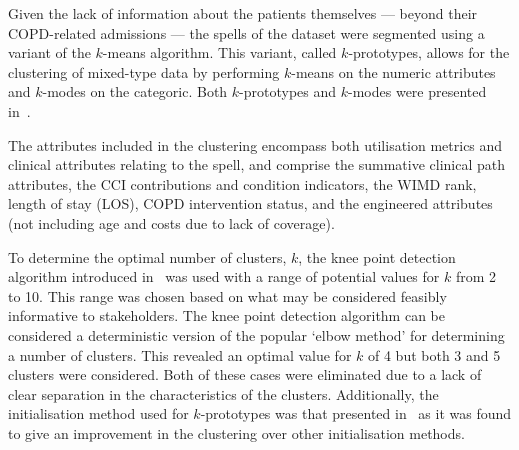 \documentclass[11pt]{article}
\begin{document}
Given the lack of information about the patients themselves --- beyond their
COPD-related admissions --- the spells of the dataset were segmented using a
variant of the \(k\)-means algorithm. This variant, called \(k\)-prototypes,
allows for the clustering of mixed-type data by performing \(k\)-means on the
numeric attributes and \(k\)-modes on the categoric. Both \(k\)-prototypes and
\(k\)-modes were presented in~\cite{Huang1998}.

The attributes included in the clustering encompass both utilisation metrics and
clinical attributes relating to the spell, and comprise the summative clinical
path attributes, the CCI contributions and condition indicators, the WIMD rank,
length of stay (LOS), COPD intervention status, and the engineered attributes
(not including age and costs due to lack of coverage).

To determine the optimal number of clusters, \(k\), the knee point detection
algorithm introduced in~\cite{Satopaa2011} was used with a range of potential
values for \(k\) from 2 to 10. This range was chosen based on what may be
considered feasibly informative to stakeholders. The knee point detection
algorithm can be considered a deterministic version of the popular `elbow
method' for determining a number of clusters. This revealed an optimal value for
\(k\) of 4 but both 3 and 5 clusters were considered. Both of these cases were
eliminated due to a lack of clear separation in the characteristics of the
clusters. Additionally, the initialisation method used for \(k\)-prototypes was
that presented in~\cite{Wilde2020} as it was found to give an improvement in the
clustering over other initialisation methods.
\end{document}

